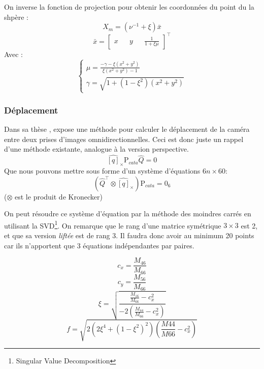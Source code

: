 On inverse la fonction de projection pour obtenir les coordonnées du point du la shpère :
\begin{equation}
X_m = (\nu^{-1} + \xi) \bar{x}
\end{equation}
\begin{equation}
\bar{x} = \begin{bmatrix}x && y && \frac{1}{1+\xi \mu} \end{bmatrix}^{\top}
\end{equation}
Avec :
\begin{equation}
  \left \{
  \begin{matrix}
    \mu = \frac{-\gamma-\xi(x^2+y^2)}{\xi(x^2+y^2)-1} \\
    \gamma = \sqrt{1+(1-\xi^2)(x^2+y^2)}
  \end{matrix}
 \right.
\end{equation}

\subsubsection*{Déplacement}

Dans sa thèse \cite{Puig11PhD}, \citeauthor{Puig11PhD} expose une méthode pour calculer le déplacement de la caméra entre deux prises d'images omnidirectionnelles.
Ceci est donc juste un rappel d'une méthode existante, analogue à la version perspective.
\begin{equation}
\widehat{[q]}_\times \text{P}_{cata} \hat{Q} = 0
\end{equation}
Que nous pouvons mettre sous forme d'un système d'équations $6n\times60$:
\begin{equation}
\left( \hat{Q}^{\top} \otimes \widehat{[q]}_\times \right) \text{P}_{cata}  = 0_6
\end{equation}
($\otimes$ est le produit de Kronecker)

On peut résoudre ce système d'équation par la méthode des moindres carrés en utilisant la SVD\footnote{Singular Value Decomposition}.
On remarque que le rang d'une matrice symétrique $3\times3$ est 2, et que sa version \emph{liftée} est de rang 3.
Il faudra donc avoir au minimum 20 points car ils n'apportent que 3 équations indépendantes par paires.

\begin{equation}
c_x = \frac{M_{46}}{M_{66}}
\end{equation}
\begin{equation}
c_y = \frac{M_{56}}{M_{66}}
\end{equation}
\begin{equation}
\xi = \sqrt{\frac{\frac{M_{16}}{M_{66}}-c_x^2}{-2\left( \frac{M_{44}}{M_{66}}-c_x^2 \right)}}
\end{equation}
\begin{equation}
f = \sqrt{2\left(2\xi^4 + \left(1-\xi^2\right)^2\right)\left(\frac{M44}{M66}-c_x^2\right)}
\end{equation}

